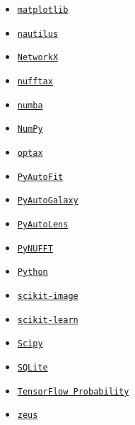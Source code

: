 \begin{itemize}
\item
\href{https://github.com/matplotlib/matplotlib}{\texttt{matplotlib}}
\citep{matplotlib}

\item
\href{https://github.com/johannesulf/nautilus}{\texttt{nautilus}}
\citep{nautilus}

\item
\href{https://github.com/networkx/networkx}{\texttt{NetworkX}}
\citep{networkx}

\item
\href{https://github.com/GragasLab/nufftax}{\texttt{nufftax}}
\citep{nufftax, finufft}

\item
\href{https://github.com/numba/numba}{\texttt{numba}}
\citep{numba}

\item
\href{https://github.com/numpy/numpy}{\texttt{NumPy}}
\citep{numpy}

\item
\href{https://github.com/google-deepmind/optax}{\texttt{optax}}
\citep{optax}

\item
\href{https://github.com/PyAutoLabs/PyAutoFit}{\texttt{PyAutoFit}}
\citep{pyautofit}

\item
\href{https://github.com/PyAutoLabs/PyAutoGalaxy}{\texttt{PyAutoGalaxy}}
\citep{Nightingale2018, pyautogalaxy}

\item
\href{https://github.com/PyAutoLabs/PyAutoLens}{\texttt{PyAutoLens}}
\citep{Nightingale2015, Nightingale2018, pyautolens}

\item
\href{https://github.com/jyhmiinlin/pynufft}{\texttt{PyNUFFT}}
\citep{pynufft}

\item
\href{https://www.python.org/}{\texttt{Python}}
\citep{python}

\item
\href{https://github.com/scikit-image/scikit-image}{\texttt{scikit-image}}
\citep{scikit-image}

\item
\href{https://github.com/scikit-learn/scikit-learn}{\texttt{scikit-learn}}
\citep{scikit-learn}

\item
\href{https://github.com/scipy/scipy}{\texttt{Scipy}}
\citep{scipy}

\item
\href{https://www.sqlite.org/index.html}{\texttt{SQLite}}
\citep{sqlite}

\item
\href{https://github.com/tensorflow/probability}{\texttt{TensorFlow Probability}}
\citep{tfp}

\item
\href{https://github.com/minaskar/zeus}{\texttt{zeus}}
\citep{zeus1, zeus2}

\end{itemize}
